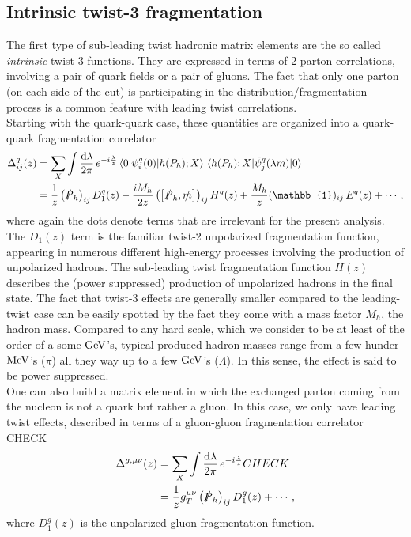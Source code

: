 \subsection{Intrinsic twist-3 fragmentation}
The first type of sub-leading twist hadronic matrix elements are the so called \textit{intrinsic} twist-3 functions. They are expressed in terms of 2-parton correlations, involving a pair of quark fields or a pair of gluons. The fact that only one parton (on each side of the cut) is participating in the distribution/fragmentation process is a common feature with leading twist correlations.\\
Starting with the quark-quark case, these quantities are organized into a quark-quark fragmentation correlator
\begin{equation}
    \begin{aligned}
        \Delta^q_{ij}(z)&= \sum_X\int\frac{\dd \lambda}{2\pi} \,e^{-i\frac{\lambda}{z}}\mel{0}{\psi^q_i(0)}{h(P_h);X}\mel{h(P_h);X}{\bar \psi^q_j(\lambda m)}{0}\\
        &= \frac{1}{z}\left(\slashed{P}_h\right)_{ij} D^q_1(z)-\frac{iM_h}{2z} \left(\comm{\slashed{P}_h}{\slashed{m}}\right)_{ij} H^q(z)+\frac{M_h}{z}(\mathbb{1})_{ij}\,E^q(z)+\cdots,
        \end{aligned}
\end{equation}
where again the dots denote terms that are irrelevant for the present analysis. The $D_1(z)$ term is the familiar twist-2 unpolarized fragmentation function, appearing in numerous different high-energy processes involving the production of unpolarized hadrons. The sub-leading twist fragmentation function $H(z)$ describes the (power suppressed) production of unpolarized hadrons in the final state. The fact that twist-3 effects are generally smaller compared to the leading-twist case can be easily spotted by the fact they come with a mass factor $M_h$, the hadron mass. Compared to any hard scale, which we consider to be at least of the order of a some $\rm GeV$'s, typical produced hadron masses range from a few hunder $\rm MeV$'s ($\pi$) all they way up to a few $\rm GeV$'s ($\Lambda$). In this sense, the effect is said to be power suppressed.\\
One can also build a matrix element in which the exchanged parton coming from the nucleon is not a quark but rather a gluon. In this case, we only have leading twist effects, described in terms of a gluon-gluon fragmentation correlator CHECK
\begin{equation}
    \begin{aligned}
        \Delta^{g,\mu\nu}(z)&= \sum_X\int\frac{\dd \lambda}{2\pi} \,e^{-i\frac{\lambda}{z}} CHECK\\
        &= \frac{1}{z} g_T^{\mu\nu}\left(\slashed{P}_h\right)_{ij} D^g_1(z)+\cdots,
        \end{aligned}
\end{equation}
where $D_1^g(z)$ is the unpolarized gluon fragmentation function.

